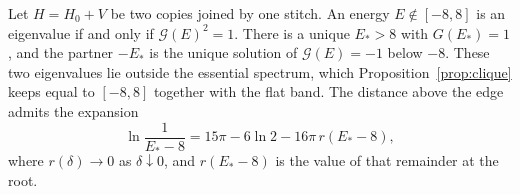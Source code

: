 \begin{proposition}
\label{prop:stitch}
Let \(H=H_0+V\) be two copies joined by one stitch.
An energy \(E\notin[-8,8]\) is an eigenvalue if and only if \(\mathcal{G}(E)^2=1\).
There is a unique \(E_*>8\) with \(G(E_*)=1\), and the partner \(-E_*\) is the
unique solution of \(\mathcal{G}(E)=-1\) below \(-8\).
These two eigenvalues lie outside the essential spectrum, which
Proposition~\ref{prop:clique} keeps equal to \([-8,8]\) together with the
flat band.
The distance above the edge admits the expansion
\begin{equation}
\label{eq:Estar}
\ln\frac{1}{E_*-8}=15\pi-6\ln 2-16\pi\, r(E_*-8),
\end{equation}
where \(r(\delta)\to 0\) as \(\delta\downarrow 0\), and \(r(E_*-8)\) is the
value of that remainder at the root.
\end{proposition}

